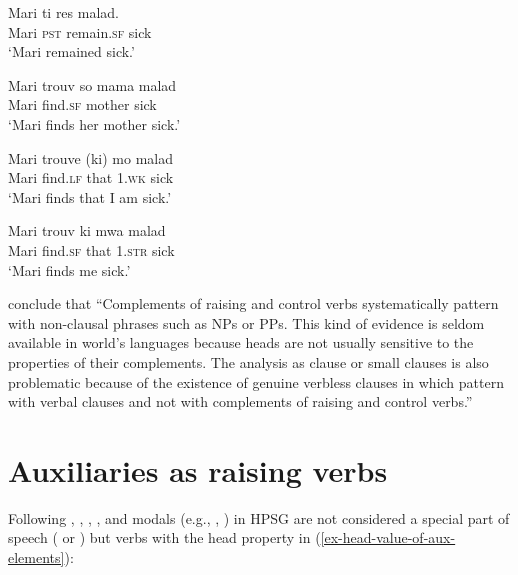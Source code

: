\eal
\ex 
\gll Mari ti res  malad.\\
     Mari \textsc{pst} remain.\textsc{sf} sick\\\hfill\citep[]{HenriandLaurens2011}
\glt `Mari remained sick.'

\ex 
\gll Mari trouv  so mama malad\\
     Mari find.\textsc{sf} \POSS{} mother sick\\
\glt `Mari finds her mother sick.'

\ex 
\gll Mari trouve (ki) mo malad\\
     Mari find.\textsc{lf} \hphantom{(}that 1\SG.\textsc{wk} sick\\
\glt `Mari finds that I am sick.'

\ex 
\gll Mari trouv            ki   mwa               malad\\
     Mari find.\textsc{sf} that 1\SG.\textsc{str} sick\\
\glt `Mari finds me sick.'
\zl

\citet[]{HenriandLaurens2011} conclude that ``Complements of raising and control verbs
systematically pattern with non-clausal phrases such as NPs or PPs. This kind of evidence is seldom
available in world's languages because heads are not usually sensitive to the properties of their
complements. The analysis as clause or small clauses is also problematic because of the existence of
genuine verbless clauses in  which pattern with verbal clauses and not with
complements of raising and control verbs.''




\section{Auxiliaries as raising verbs}
\label{sec-auxiliaries-as-raising-verbs}

Following \citep{Ross69a-u,Gazdaretal1982, Sagetal2020}, , , , and
modals (e.g., , ) in HPSG are not considered a special part of speech
( or ) but verbs with the head property in
(\ref{ex-head-value-of-aux-elements}):

\begin{exe}
\ex \label{ex-head-value-of-aux-elements}
   \impl
\avm{
	[head &	[aux & $+$] ]
}
 \end{exe}
 
